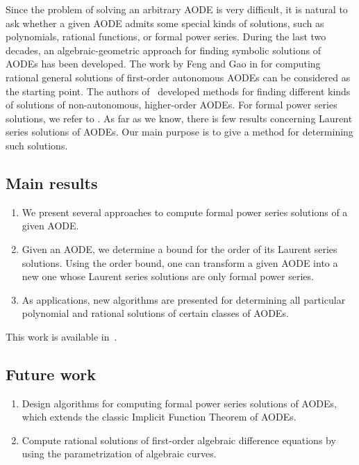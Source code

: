 \documentclass[10pt,a4paper]{article}
\begin{document}
Since the problem of solving an arbitrary AODE is very difficult, 
it is natural to ask whether a given AODE admits some special kinds of solutions, 
such as polynomials, rational functions, or formal power series. 
During the last two decades, an algebraic-geometric approach for finding symbolic solutions of AODEs has been developed. 
The work by Feng and Gao in \cite{FengGao, FengGao06} for computing rational general solutions of first-order autonomous AODEs 
can be considered as the starting point. 
The authors of~\cite{NgoWinkler11b, GraseggerThesis, VoWinkler2015, VoGraseggerWinkler2017} 
developed methods for finding different kinds of solutions of non-autonomous, higher-order AODEs. 
For formal power series solutions, we refer to \cite{DenefLipshitz,SingerFormalSolutions}.
As far as we know, there is few results concerning Laurent series solutions of AODEs. 
Our main purpose is to give a method for determining such solutions.

\subsection{Main results}

\begin{enumerate}
 \item We present several approaches to compute formal power series solutions of a given AODE.
 \item Given an AODE, we determine a bound for the order of its Laurent series solutions. 
 Using the order bound, one can transform a given AODE into a new one whose Laurent series solutions are only formal power series.
 \item As applications, new algorithms are presented for determining all particular polynomial and rational solutions of certain classes of AODEs.
\end{enumerate}



This work is available in~\cite{VoZhang2017}.

\subsection{Future work}

\begin{enumerate}
 \item Design algorithms for computing formal power series solutions of AODEs, which extends the classic Implicit Function Theorem of AODEs.
 \item Compute rational solutions of first-order algebraic difference equations by using the parametrization of algebraic curves.  
\end{enumerate}
\end{document}
